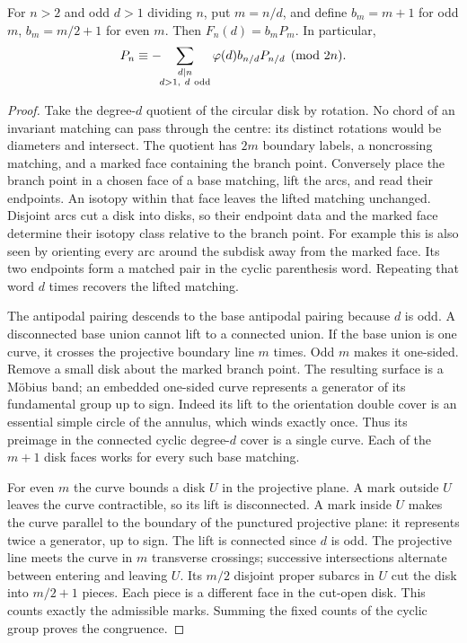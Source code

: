 \begin{proposition}
For \(n>2\) and odd \(d>1\) dividing \(n\), put \(m=n/d\), and define \(b_m=m+1\) for odd \(m\), \(b_m=m/2+1\) for even \(m\). Then \(F_n(d)=b_mP_m\). In particular,
\[
 P_n\equiv-\!\!\sum_{\substack{d\mid n\\d>1,\ d\ {\rm odd}}}\varphi(d)b_{n/d}P_{n/d}\pmod{2n}.
\]
\end{proposition}
\begin{proof}
Take the degree-\(d\) quotient of the circular disk by rotation. No chord of an invariant matching can pass through the centre: its distinct rotations would be diameters and intersect. The quotient has \(2m\) boundary labels, a noncrossing matching, and a marked face containing the branch point. Conversely place the branch point in a chosen face of a base matching, lift the arcs, and read their endpoints. An isotopy within that face leaves the lifted matching unchanged. Disjoint arcs cut a disk into disks, so their endpoint data and the marked face determine their isotopy class relative to the branch point. For example this is also seen by orienting every arc around the subdisk away from the marked face. Its two endpoints form a matched pair in the cyclic parenthesis word. Repeating that word \(d\) times recovers the lifted matching.

The antipodal pairing descends to the base antipodal pairing because \(d\) is odd. A disconnected base union cannot lift to a connected union. If the base union is one curve, it crosses the projective boundary line \(m\) times. Odd \(m\) makes it one-sided. Remove a small disk about the marked branch point. The resulting surface is a M\"obius band; an embedded one-sided curve represents a generator of its fundamental group up to sign. Indeed its lift to the orientation double cover is an essential simple circle of the annulus, which winds exactly once. Thus its preimage in the connected cyclic degree-\(d\) cover is a single curve. Each of the \(m+1\) disk faces works for every such base matching.

For even \(m\) the curve bounds a disk \(U\) in the projective plane. A mark outside \(U\) leaves the curve contractible, so its lift is disconnected. A mark inside \(U\) makes the curve parallel to the boundary of the punctured projective plane: it represents twice a generator, up to sign. The lift is connected since \(d\) is odd. The projective line meets the curve in \(m\) transverse crossings; successive intersections alternate between entering and leaving \(U\). Its \(m/2\) disjoint proper subarcs in \(U\) cut the disk into \(m/2+1\) pieces. Each piece is a different face in the cut-open disk. This counts exactly the admissible marks. Summing the fixed counts of the cyclic group proves the congruence.
\end{proof}

